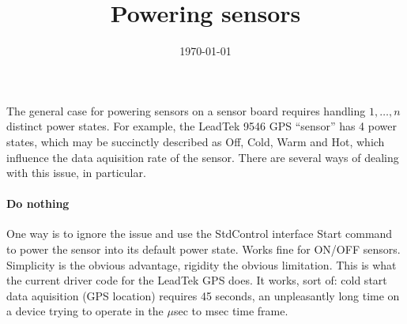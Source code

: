 \documentclass[10pt]{article}
\begin{document}
\title{Powering sensors}
\date{\today}
\maketitle




The general case for powering sensors on a sensor
board requires handling $1,\ldots,n$ distinct
power states.  For example, the 
LeadTek 9546 GPS ``sensor'' has 4 power states,
which may be succinctly described as 
Off, Cold, Warm and Hot, which influence the 
data aquisition rate of the sensor.
There are several ways of dealing with this issue,
in particular.



\paragraph{Do nothing}
One way is to ignore the issue and use the StdControl 
interface Start command to power 
the sensor into its default power state.
Works fine for ON/OFF sensors.
Simplicity is the obvious advantage, rigidity
the obvious limitation.
This is what the current driver code for the 
LeadTek GPS does.  It works, sort of:  cold
start data aquisition (GPS location) requires
45 seconds, an unpleasantly long time on a device
trying to operate in the $\mu$sec to msec time
frame.

\end{document}
